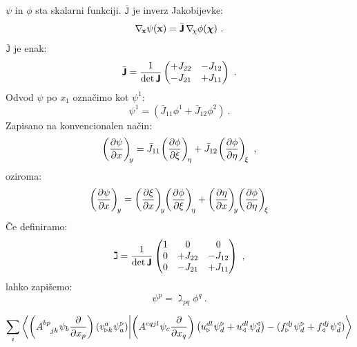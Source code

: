 $\psi$ in $\phi$ sta skalarni funkciji. $\bar{\texttt{J}}$ je inverz Jakobijevke:
\begin{equation}
   \mathbf{\nabla_{\mkern-3mu x}} \psi(\mathbf{x}) = \bar{\bm{\mathsf{J}}} \mkern3mu \mathbf{\nabla_{\mkern-4mu \chi}} \phi(\bm{\chi}) \ .
\end{equation}
$\bar{\texttt{J}}$ je enak:
\begin{equation}
   \bar{\bm{\mathsf{J}}}
   =
   \frac{1}{\det \bm{\mathsf{J}}}
   \begin{pmatrix}
      +J_{22} & -J_{12} \\
      -J_{21} & +J_{11}
   \end{pmatrix}
   \ .
\end{equation}
Odvod $\psi$ po $x_1$ označimo kot $\psi^1$:
\begin{equation}
   \psi^1 = \left(\bar{J}_{11} \phi^1 + \bar{J}_{12} \phi^2 \right) \ .
\end{equation}
Zapisano na konvencionalen način:
\begin{equation}
   \left(\frac{\partial \psi}{\partial x}\right)_{\mkern-4mu y}
   =
   \bar{J}_{11} \mkern-2mu \left(\frac{\partial \phi}{\partial \xi}\right)_{\mkern-3mu \eta}
   +
   \bar{J}_{12} \mkern-2mu \left(\frac{\partial \phi}{\partial \eta}\right)_{\mkern-3mu \xi} \ ,
\end{equation}
oziroma:
\begin{equation}
   \left(\frac{\partial \psi}{\partial x} \right)_{\mkern-3mu y}
   =
   \left(\frac{\partial \xi}{\partial x} \right)_{\mkern-4mu y}
      \mkern-4mu \left(\frac{\partial \phi}{\partial \xi}\right)_{\mkern-3mu \eta}
   +
   \left(\frac{\partial \eta}{\partial x}\right)_{\mkern-4mu y}
      \mkern-4mu \left(\frac{\partial \phi}{\partial \eta}\right)_{\mkern-3mu \xi}
\end{equation}
Če definiramo:
\begin{equation}
   \bm{\mathsf{\gimel}}
   =
   \frac{1}{\det \bm{\mathsf{J}}}
   \begin{pmatrix}
      1 & 0 & 0 \\
      0 & +J_{22} & -J_{12} \\
      0 & -J_{21} & +J_{11}
   \end{pmatrix} \ ,
\end{equation}
lahko zapišemo:
\begin{equation}
   \psi^p = \gimel_{pq} \phi^{q} \ .
   \label{eq:refToEmt}
\end{equation}

\begin{equation}
   \sum_i \bra{
      \left(A^{bp}_{\phantom{bp}jk} \mkern1mu \psi_b \frac{\partial}{\partial x_p}\right)
         \left(v^a_{\triangleright k} \mkern1mu \psi^\triangleright_a\right)}
   \ket{
      \left(A^{cqjl} \mkern1mu \psi_c \frac{\partial}{\partial x_q}\right)
         \left(u^{dl}_\triangleright \mkern1mu \psi^\triangleright_d + u^{dl}_\triangleleft \mkern1mu \psi^\triangleleft_d \right)
      -
      (f^{dj}_\triangleright \mkern1mu \psi^\triangleright_d
      +
      f^{dj}_\triangleleft \mkern1mu \psi^\triangleleft_d)}
\end{equation}

